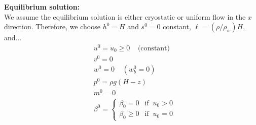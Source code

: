 \documentclass[paper=a4, fontsize=11pt]{article}
\begin{document}
\noindent\textbf{Equilibrium solution:}\\
We assume the equilibrium solution is either cryostatic or uniform flow in the $x$ direction.
Therefore, we choose $h^0=H$ and $s^0=0$ constant, $\ell=(\rho/\rho_w)H$, and...
\begin{align}
&u^0 = u_0\geq 0\;\;\;\; \text{(constant)} \\
& v^0 = 0 \\
&w^0 = 0 \;\;\;\; (w_b^0=0)\\
&p^0 = \rho g (H-z) \\
& m^0 = 0\\
&\beta^0  = \begin{cases}
\beta_0 = 0 & \text{if} \;\; u_0>0 \\
\beta_0 \geq 0 & \text{if} \;\; u_0 =0
\end{cases}
\end{align}
\end{document}
